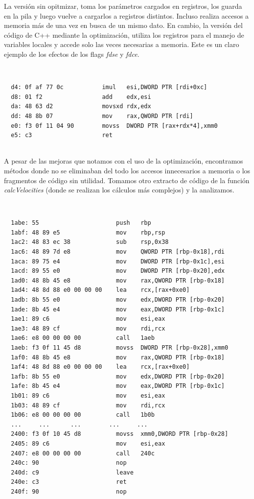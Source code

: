 La versión sin opitmizar, toma los parámetros cargados en registros, los guarda en la pila y luego vuelve a cargarlos a registros distintos. Incluso realiza accesos a memoria más de una vez en busca de un mismo dato.
En cambio, la versión del código de C++ mediante la optimización, utiliza los registros para el manejo de variables locales y accede solo las veces necesarias a memoria. Este es un claro ejemplo de los efectos de los flags \textit{fdse} y \textit{fdce}.


~\\

{} 
\begin{lstlisting}
  d4: 0f af 77 0c           imul   esi,DWORD PTR [rdi+0xc]
  d8: 01 f2                 add    edx,esi
  da: 48 63 d2              movsxd rdx,edx
  dd: 48 8b 07              mov    rax,QWORD PTR [rdi]
  e0: f3 0f 11 04 90        movss  DWORD PTR [rax+rdx*4],xmm0
  e5: c3                    ret  
\end{lstlisting}




~\\

A pesar de las mejoras que notamos con el uso de la optimización, encontramos métodos donde no se eliminaban del todo los accesos innecesarios a memoria o los fragmentos de código sin utilidad. Tomamos otro extracto de código de la función \textit{calcVelocities} (donde se realizan los cálculos más complejos) y la analizamos. 

~\\

{} 
\begin{lstlisting}
  1abe:	55                   	push   rbp
  1abf:	48 89 e5             	mov    rbp,rsp
  1ac2:	48 83 ec 38          	sub    rsp,0x38
  1ac6:	48 89 7d e8          	mov    QWORD PTR [rbp-0x18],rdi
  1aca:	89 75 e4             	mov    DWORD PTR [rbp-0x1c],esi
  1acd:	89 55 e0             	mov    DWORD PTR [rbp-0x20],edx
  1ad0:	48 8b 45 e8          	mov    rax,QWORD PTR [rbp-0x18]
  1ad4:	48 8d 88 e0 00 00 00 	lea    rcx,[rax+0xe0]
  1adb:	8b 55 e0             	mov    edx,DWORD PTR [rbp-0x20]
  1ade:	8b 45 e4             	mov    eax,DWORD PTR [rbp-0x1c]
  1ae1:	89 c6                	mov    esi,eax
  1ae3:	48 89 cf             	mov    rdi,rcx
  1ae6:	e8 00 00 00 00       	call   1aeb 
  1aeb:	f3 0f 11 45 d8       	movss  DWORD PTR [rbp-0x28],xmm0
  1af0:	48 8b 45 e8          	mov    rax,QWORD PTR [rbp-0x18]
  1af4:	48 8d 88 e0 00 00 00 	lea    rcx,[rax+0xe0]
  1afb:	8b 55 e0             	mov    edx,DWORD PTR [rbp-0x20]
  1afe:	8b 45 e4             	mov    eax,DWORD PTR [rbp-0x1c]
  1b01:	89 c6                	mov    esi,eax
  1b03:	48 89 cf             	mov    rdi,rcx
  1b06:	e8 00 00 00 00       	call   1b0b 
  ...     ...      ...        ...     ...
  2400:	f3 0f 10 45 d8       	movss  xmm0,DWORD PTR [rbp-0x28]
  2405:	89 c6                	mov    esi,eax
  2407:	e8 00 00 00 00       	call   240c 
  240c:	90                   	nop
  240d:	c9                   	leave  
  240e:	c3                   	ret    
  240f:	90                   	nop
\end{lstlisting}

